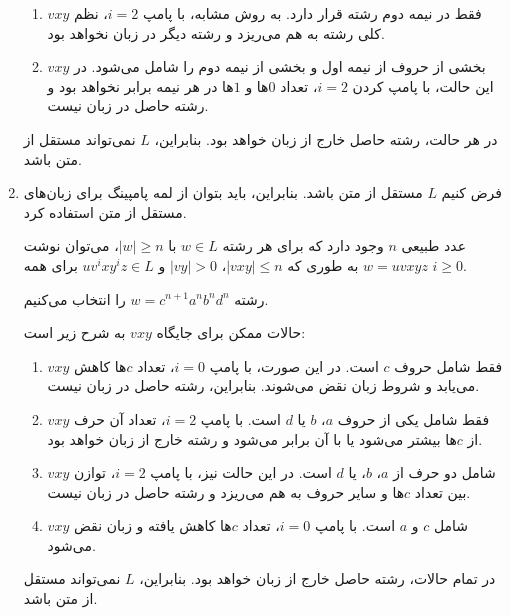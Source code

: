 \begin{enumerate}
\begin{enumerate}
		\item \( vxy \) فقط در نیمه دوم رشته قرار دارد. به روش مشابه، با پامپ \( i = 2 \)، نظم کلی رشته به هم می‌ریزد و رشته دیگر در زبان نخواهد بود.
		
		\item \( vxy \) بخشی از حروف از نیمه اول و بخشی از نیمه دوم را شامل می‌شود. در این حالت، با پامپ کردن \( i = 2 \)، تعداد \( 0 \)ها و \( 1 \)ها در هر نیمه برابر نخواهد بود و رشته حاصل در زبان نیست.
	\end{enumerate}
	
	در هر حالت، رشته حاصل خارج از زبان خواهد بود. بنابراین، \( L \) نمی‌تواند مستقل از متن باشد.
	
	
	\item
	
	فرض کنیم \( L \) مستقل از متن باشد. بنابراین، باید بتوان از لمه پامپینگ برای زبان‌های مستقل از متن استفاده کرد.
	
	عدد طبیعی \( n \) وجود دارد که برای هر رشته \( w \in L \) با \( |w| \geq n \)، می‌توان نوشت \( w = uvxyz \) به طوری که \( |vxy| \leq n \)، \( |vy| > 0 \) و \( uv^i xy^i z \in L \) برای همه \( i \geq 0 \).
	
	رشته \( w = c^{n+1} a^n b^n d^n \) را انتخاب می‌کنیم.
	
	حالات ممکن برای جایگاه \( vxy \) به شرح زیر است:
	
	\begin{enumerate}
		\item \( vxy \) فقط شامل حروف \( c \) است. در این صورت، با پامپ \( i = 0 \)، تعداد \( c \)ها کاهش می‌یابد و شروط زبان نقض می‌شوند. بنابراین، رشته حاصل در زبان نیست.
		
		\item \( vxy \) فقط شامل یکی از حروف \( a \)، \( b \) یا \( d \) است. با پامپ \( i = 2 \)، تعداد آن حرف از \( c \)ها بیشتر می‌شود یا با آن برابر می‌شود و رشته خارج از زبان خواهد بود.
		
		\item \( vxy \) شامل دو حرف از \( a \)، \( b \)، یا \( d \) است. در این حالت نیز، با پامپ \( i = 2 \)، توازن بین تعداد \( c \)ها و سایر حروف به هم می‌ریزد و رشته حاصل در زبان نیست.
		
		\item \( vxy \) شامل \( c \) و \( a \) است. با پامپ \( i = 0 \)، تعداد \( c \)ها کاهش یافته و زبان نقض می‌شود.
	\end{enumerate}
	
	در تمام حالات، رشته حاصل خارج از زبان خواهد بود. بنابراین، \( L \) نمی‌تواند مستقل از متن باشد.
	
\end{enumerate}






